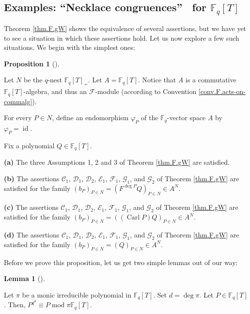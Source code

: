 \documentclass[numbers=enddot,12pt,final,onecolumn,notitlepage]{scrartcl}%
\theoremstyle{definition}
\newtheorem{lem}[theo]{Lemma}
\newenvironment{lemma}[1][]
{\begin{lem}[#1]\begin{leftbar}}
{\end{leftbar}\end{lem}}
\newtheorem{prop}[theo]{Proposition}
\newenvironment{proposition}[1][]
{\begin{prop}[#1]\begin{leftbar}}
{\end{leftbar}\end{prop}}
\begin{document}
\subsection{Examples: \textquotedblleft Necklace congruences\textquotedblright%
\ for $\mathbb{F}_{q}\left[  T\right]  $}

Theorem \ref{thm.F.gW} shows the equivalence of several assertions, but we
have yet to see a situation in which these assertions hold. Let us now explore
a few such situations. We begin with the simplest ones:

\begin{proposition}
\label{prop.F.gW.example1}Let $N$ be the $q$-nest $\mathbb{F}_{q}\left[
T\right]  _{+}$. Let $A=\mathbb{F}_{q}\left[  T\right]  $. Notice that $A$ is
a commutative $\mathbb{F}_{q}\left[  T\right]  $-algebra, and thus an
$\mathcal{F}$-module (according to Convention \ref{conv.F.acts-on-commalg}).

For every $P\in N$, define an endomorphism $\varphi_{P}$ of the $\mathbb{F}%
_{q}$-vector space $A$ by $\varphi_{P}=\operatorname*{id}$.

Fix a polynomial $Q\in\mathbb{F}_{q}\left[  T\right]  $.

\textbf{(a)} The three Assumptions 1, 2 and 3 of Theorem \ref{thm.F.gW} are satisfied.

\textbf{(b)} The assertions $\mathcal{C}_{1}$, $\mathcal{D}_{1}$,
$\mathcal{D}_{2}$, $\mathcal{E}_{1}$, $\mathcal{F}_{1}$, $\mathcal{G}_{1}$,
and $\mathcal{G}_{2}$ of Theorem \ref{thm.F.gW} are satisfied for the family
$\left(  b_{P}\right)  _{P\in N}=\left(  F^{\deg P}Q\right)  _{P\in N}\in
A^{N}$.

\textbf{(c)} The assertions $\mathcal{C}_{1}$, $\mathcal{D}_{1}$,
$\mathcal{D}_{2}$, $\mathcal{E}_{1}$, $\mathcal{F}_{1}$, $\mathcal{G}_{1}$,
and $\mathcal{G}_{2}$ of Theorem \ref{thm.F.gW} are satisfied for the family
$\left(  b_{P}\right)  _{P\in N}=\left(  \left(  \operatorname*{Carl}P\right)
Q\right)  _{P\in N}\in A^{N}$.

\textbf{(d)} The assertions $\mathcal{C}_{1}$, $\mathcal{D}_{1}$,
$\mathcal{D}_{2}$, $\mathcal{E}_{1}$, $\mathcal{F}_{1}$, $\mathcal{G}_{1}$,
and $\mathcal{G}_{2}$ of Theorem \ref{thm.F.gW} are satisfied for the family
$\left(  b_{P}\right)  _{P\in N}=\left(  Q\right)  _{P\in N}\in A^{N}$.
\end{proposition}

Before we prove this proposition, let us get two simple lemmas out of our way:

\begin{lemma}
\label{lem.F.gW.example1.lem.dumbed-down}Let $\pi$ be a monic irreducible
polynomial in $\mathbb{F}_{q}\left[  T\right]  $. Set $d=\deg\pi$. Let
$P\in\mathbb{F}_{q}\left[  T\right]  $. Then, $P^{q^{d}}\equiv
P\operatorname{mod}\pi\mathbb{F}_{q}\left[  T\right]  $.
\end{lemma}
\end{document}
